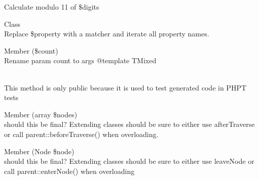 \begin{DoxyRefList}
\label{todo__todo000004}%
%
Calculate modulo 11 of \$digits 
\item[Class \doxylink{class_hamcrest_1_1_core_1_1_set}{Hamcrest\textbackslash{}Core\textbackslash{}Set} ]\hfill \\
\label{todo__todo000009}%
%
Replace \$property with a matcher and iterate all property names.  
\item[Member \doxylink{class_mockery_1_1_exception_1_1_no_matching_expectation_exception_a34fa8e3d5582f0af3a6958df3b609801}{Mockery\textbackslash{}Exception\textbackslash{}No\+Matching\+Expectation\+Exception\+::set\+Actual\+Arguments} (\$count)]\hfill \\
\label{todo__todo000011}%
%
Rename param {\ttfamily count} to {\ttfamily args} @template TMixed 
\item[Member \doxylink{class_p_h_p_unit_1_1_framework_1_1_mock_object_1_1_generator_1_1_generator_a3dc4a6cb7d2a2ec3f1e99703c84db8e1}{PHPUnit\textbackslash{}Framework\textbackslash{}Mock\+Object\textbackslash{}Generator\textbackslash{}Generator\+::generate} (string \$type, bool \$mock\+Object, bool \$mark\+As\+Mock\+Object, ?array \$methods=null, string \$mock\+Class\+Name=\textquotesingle{}\textquotesingle{}, bool \$call\+Original\+Clone=true, bool \$call\+Autoload=true, bool \$clone\+Arguments=true, bool \$call\+Original\+Methods=false)]\hfill \\
\label{todo__todo000012}%
%
This method is only public because it is used to test generated code in PHPT tests 
\item[Member \doxylink{class_psy_1_1_code_cleaner_1_1_namespace_aware_pass_a120c726916a39ddc89cd8dfea9bf20a1}{Psy\textbackslash{}Code\+Cleaner\textbackslash{}Namespace\+Aware\+Pass\+::before\+Traverse} (array \$nodes)]\hfill \\
\label{todo__todo000013}%
%
should this be final? Extending classes should be sure to either use after\+Traverse or call parent\+::before\+Traverse() when overloading. 
\item[Member \doxylink{class_psy_1_1_code_cleaner_1_1_namespace_aware_pass_a4da460d1b79c613caef52f6e9d44f974}{Psy\textbackslash{}Code\+Cleaner\textbackslash{}Namespace\+Aware\+Pass\+::enter\+Node} (Node \$node)]\hfill \\
\label{todo__todo000014}%
%
should this be final? Extending classes should be sure to either use leave\+Node or call parent\+::enter\+Node() when overloading 

\end{DoxyRefList}
